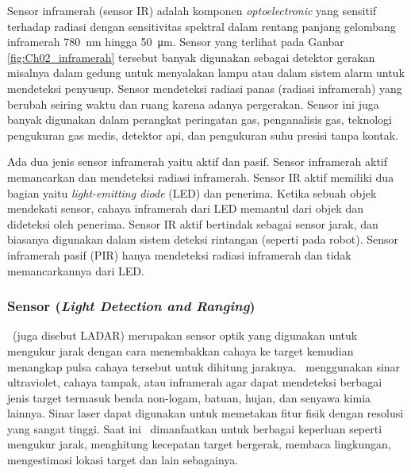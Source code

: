         Sensor inframerah (sensor IR) adalah komponen \textit{optoelectronic} yang sensitif terhadap radiasi dengan sensitivitas spektral dalam rentang panjang gelombang inframerah \SI{780}{\nano\metre} hingga \SI{50}{\micro\metre}\cite{b5}. 
        Sensor yang terlihat pada Ganbar \ref{fig:Ch02_inframerah} tersebut banyak digunakan sebagai detektor gerakan misalnya dalam gedung untuk menyalakan lampu atau dalam sistem alarm untuk mendeteksi penyusup. Sensor mendeteksi radiasi panas (radiasi inframerah) yang berubah seiring waktu dan ruang karena adanya pergerakan. Sensor ini juga banyak digunakan dalam perangkat peringatan gas, penganalisis gas, teknologi pengukuran gas medis, detektor api, dan pengukuran suhu presisi tanpa kontak. 

        Ada dua jenis sensor inframerah yaitu aktif dan pasif. Sensor inframerah aktif memancarkan dan mendeteksi radiasi inframerah. Sensor IR aktif memiliki dua bagian yaitu \textit{light-emitting diode} (LED) dan penerima. Ketika sebuah objek mendekati sensor, cahaya inframerah dari LED memantul dari objek dan dideteksi oleh penerima. Sensor IR aktif bertindak sebagai sensor jarak, dan biasanya digunakan dalam sistem deteksi rintangan (seperti pada robot). Sensor inframerah pasif (PIR) hanya mendeteksi radiasi inframerah dan tidak memancarkannya dari LED.

        \subsubsection{Sensor \lidar (\textit{Light Detection and Ranging})}
        \label{subsec:lidar_sensor}
        
        
         \lidar\ (juga disebut LADAR) merupakan sensor optik yang digunakan untuk mengukur jarak dengan cara menembakkan cahaya ke target kemudian menangkap pulsa cahaya tersebut untuk dihitung jaraknya.  \lidar\ menggunakan sinar ultraviolet, cahaya tampak, atau inframerah agar dapat mendeteksi berbagai jenis target termasuk benda non-logam, batuan, hujan, dan senyawa kimia lainnya. Sinar laser dapat digunakan untuk memetakan fitur fisik dengan resolusi yang sangat tinggi. Saat ini \lidar\ dimanfaatkan untuk berbagai keperluan seperti mengukur jarak, menghitung kecepatan target bergerak, membaca lingkungan, mengestimasi lokasi target dan lain sebagainya. 
         
